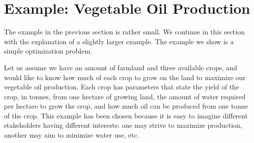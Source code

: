 \documentclass[a4paper]{article}
\begin{document}
\section{Example: Vegetable Oil Production}

The example in the previous section is rather small. We continue in this section
with the explanation of a slightly larger example. The example we show is a
simple optimization problem.

Let us assume we have an amount of farmland and three available crops, and would
like to know how much of each crop to grow on the land to maximize our vegetable
oil production. Each crop has parameters that state the yield of the crop, in
tonnes, from one hectare of growing land, the amount of water required per
hectare to grow the crop, and how much oil can be produced from one tonne of the
crop.
%
This example has been chosen because it is easy to imagine different
stakeholders having different interests: one may strive to maximize
production, another may aim to minimize water use, etc.
\end{document}
